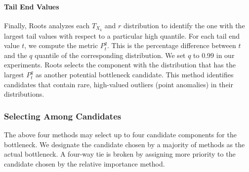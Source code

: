 \paragraph*{Tail End Values}
Finally, Roots analyzes each $T_{X_k}$ and $r$ distribution to identify the one 
with the largest tail values with respect to a particular high quantile.
For each tail end value $t$, we compute the metric $P^q_t$. 
This is the percentage difference between $t$ and the
$q$ quantile of the corresponding distribution. We set $q$ to 0.99 in our experiments.
Roots selects the component with the 
distribution that has the largest $P^q_t$ as another potential bottleneck candidate.
This method identifies
candidates that contain rare, high-valued outliers (point anomalies) in their distributions.

\subsubsection{Selecting Among Candidates}
The above four methods may select up to four candidate components for the bottleneck. 
We designate 
the candidate chosen by a majority of methods as the actual bottleneck. A four-way
tie is broken by assigning more priority to the candidate chosen by the relative importance
method.
